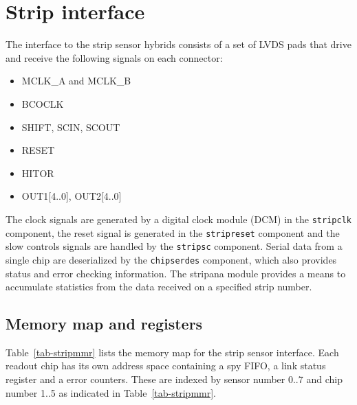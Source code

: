 \documentclass[11pt]{article}
\begin{document}
\pagebreak
\section{Strip interface}

The interface to the strip sensor hybrids consists of a set of LVDS
pads that drive and receive the following signals on each connector:
\begin{itemize}
  \item MCLK\_A and MCLK\_B
  \item BCOCLK
  \item SHIFT, SCIN, SCOUT
  \item RESET
  \item HITOR
  \item OUT1[4..0], OUT2[4..0]
\end{itemize}
The clock signals are generated by a digital clock module (DCM) in the
{\tt stripclk} component, the reset signal is generated in the {\tt stripreset}
component and the slow controls signals are handled by the {\tt stripsc}
component.  Serial data from a single chip are deserialized by the
{\tt chipserdes} component, which also provides status and error checking
information.  The {\sc stripana} module provides a means to accumulate
statistics from the data received on a specified strip number.

\subsection{Memory map and registers}

Table~\ref{tab-stripmmr} lists the memory map for the strip sensor
interface.  Each readout chip has its own address space containing a
spy FIFO, a link status register and a error counters.  These are indexed
by sensor number 0..7 and chip number 1..5 as indicated in
Table~\ref{tab-stripmmr}.
\end{document}

